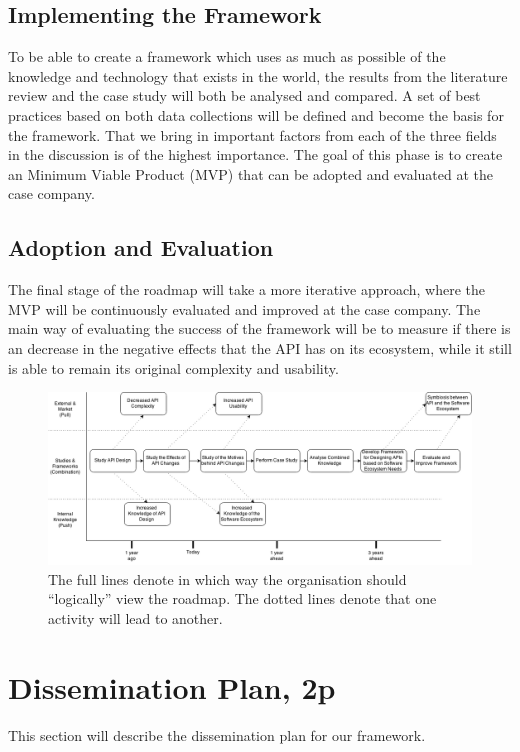 \documentclass{article}
\begin{document}
\subsection{Implementing the Framework}
To be able to create a framework which uses as much as possible of the knowledge and technology that exists in the world, the results from the literature review and the case study will both be analysed and compared. A set of best practices based on both data collections will be defined and become the basis for the framework. That we bring in important factors from each of the three fields in the discussion is of the highest importance. The goal of this phase is to create an Minimum Viable Product (MVP) that can be adopted and evaluated at the case company. 

\subsection{Adoption and Evaluation}
The final stage of the roadmap will take a more iterative approach, where the MVP will be continuously evaluated and improved at the case company. The main way of evaluating the success of the framework will be to measure if there is an decrease in the negative effects that the API has on its ecosystem, while it still is able to remain its original complexity and usability. 

\begin{figure}
\centering
\includegraphics[width=220mm]{RoadMap.png}
\caption{The full lines denote in which way the organisation should ``logically'' view the roadmap. The dotted lines denote that one activity will lead to another. }
\label{fig:roadmap}
\end{figure}

\section{Dissemination Plan, 2p}
This section will describe the dissemination plan for our framework. 
\end{document}
